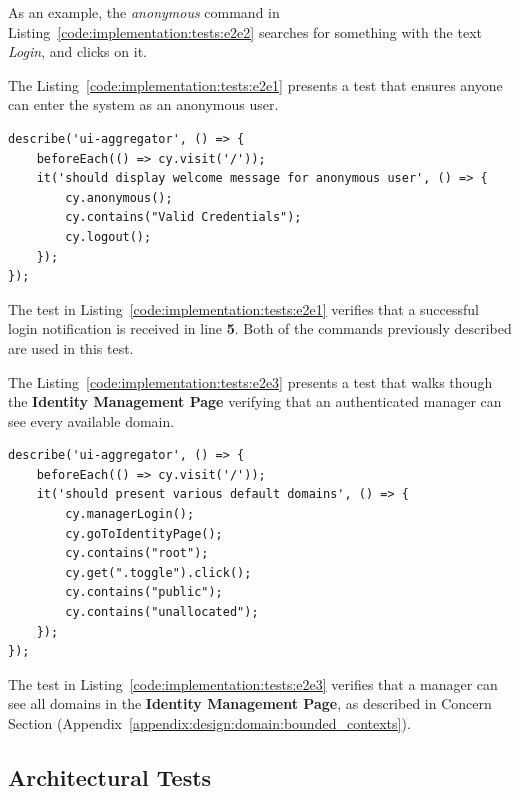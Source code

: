 As an example, the \textit{anonymous} command in Listing~\ref{code:implementation:tests:e2e2} searches for something with the text \textit{Login}, and clicks on it.

The Listing~\ref{code:implementation:tests:e2e1} presents a test that ensures anyone can enter the system as an anonymous user.

\begin{lstlisting}[style=javascript, caption=End-to-End Test - Anonymous Authentication - UI Aggregator, label={code:implementation:tests:e2e1}]
describe('ui-aggregator', () => {
    beforeEach(() => cy.visit('/'));
    it('should display welcome message for anonymous user', () => {
        cy.anonymous();
        cy.contains("Valid Credentials");
        cy.logout();
    });
});
\end{lstlisting}

The test in Listing~\ref{code:implementation:tests:e2e1} verifies that a successful login notification is received in line \textbf{5}. Both of the commands previously described are used in this test.

The Listing~\ref{code:implementation:tests:e2e3} presents a test that walks though the \textbf{Identity Management Page} verifying that an authenticated manager can see every available domain.

\begin{lstlisting}[style=javascript, caption=End-to-End Test - Discover Available Domains - Identity Management, label={code:implementation:tests:e2e3}]
describe('ui-aggregator', () => {
    beforeEach(() => cy.visit('/'));
    it('should present various default domains', () => {
        cy.managerLogin();
        cy.goToIdentityPage();
        cy.contains("root");
        cy.get(".toggle").click();
        cy.contains("public");
        cy.contains("unallocated");
    });
});
\end{lstlisting}

The test in Listing~\ref{code:implementation:tests:e2e3} verifies that a manager can see all domains in the \textbf{Identity Management Page}, as described in  Concern Section (Appendix~\ref{appendix:design:domain:bounded_contexts}).

\subsection{Architectural Tests}
\label{subsec:implementation:tests:arch}

